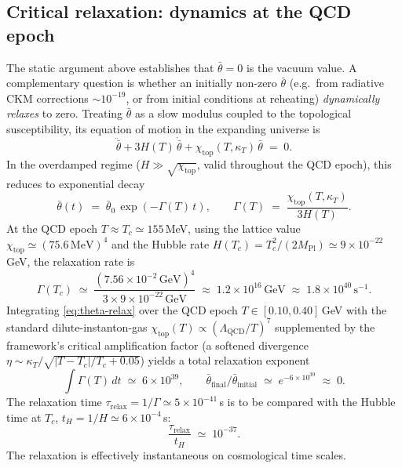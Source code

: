\documentclass[11pt,a4paper]{article}
\theoremstyle{plain}
\theoremstyle{definition}
\theoremstyle{remark}
\begin{document}
\subsection{Critical relaxation: dynamics at the QCD epoch}
\label{ssec:relaxation}

The static argument above establishes that $\bar\theta = 0$ is the
vacuum value.  A complementary question is whether an initially
non-zero $\bar\theta$ (e.g.\ from radiative CKM corrections
$\sim 10^{-19}$, or from initial conditions at reheating)
\emph{dynamically relaxes} to zero.  Treating $\bar\theta$ as a slow
modulus coupled to the topological susceptibility, its equation of
motion in the expanding universe is
\begin{equation}
\label{eq:theta-eom}
  \ddot{\bar\theta} + 3H(T)\,\dot{\bar\theta}
  + \chi_{\mathrm{top}}(T,\kappa_T)\,\bar\theta \;=\; 0.
\end{equation}
In the overdamped regime ($H \gg \sqrt{\chi_{\mathrm{top}}}$, valid
throughout the QCD epoch), this reduces to exponential decay
\begin{equation}
\label{eq:theta-relax}
  \bar\theta(t) \;=\; \bar\theta_0\,\exp(-\Gamma(T)\,t),
  \qquad \Gamma(T) \;=\; \frac{\chi_{\mathrm{top}}(T,\kappa_T)}{3H(T)}.
\end{equation}
At the QCD epoch $T \approx T_c \simeq 155\,$MeV, using the lattice
value $\chi_{\mathrm{top}} \simeq (75.6\,\mathrm{MeV})^4$ and the
Hubble rate $H(T_c) = T_c^2/(2M_{\mathrm{Pl}}) \simeq 9 \times
10^{-22}\,$GeV, the relaxation rate is
\begin{equation}
  \Gamma(T_c) \;\simeq\; \frac{(7.56\times 10^{-2}\,\mathrm{GeV})^4}
                                  {3 \times 9 \times 10^{-22}\,\mathrm{GeV}}
              \;\approx\; 1.2 \times 10^{16}\,\mathrm{GeV}
              \;\approx\; 1.8 \times 10^{40}\,\mathrm{s}^{-1}.
\end{equation}
Integrating \eqref{eq:theta-relax} over the QCD epoch
$T \in [0.10, 0.40]\,$GeV with the standard dilute-instanton-gas
$\chi_{\mathrm{top}}(T) \propto (\Lambda_{\mathrm{QCD}}/T)^7$
supplemented by the framework's critical amplification factor (a
softened divergence $\eta \sim \kappa_T/\sqrt{|T-T_c|/T_c + 0.05}$)
yields a total relaxation exponent
\begin{equation}
  \int \Gamma(T)\,dt \;\simeq\; 6 \times 10^{39},
  \qquad
  \bar\theta_{\mathrm{final}}/\bar\theta_{\mathrm{initial}}
  \;\simeq\; e^{-6\times 10^{39}} \;\approx\; 0.
\end{equation}
The relaxation time $\tau_{\mathrm{relax}} = 1/\Gamma \simeq
5 \times 10^{-41}\,$s is to be compared with the Hubble time at
$T_c$, $t_H = 1/H \simeq 6 \times 10^{-4}\,$s:
\begin{equation}
  \frac{\tau_{\mathrm{relax}}}{t_H} \;\simeq\; 10^{-37}.
\end{equation}
The relaxation is effectively instantaneous on cosmological time
scales.
\end{document}
